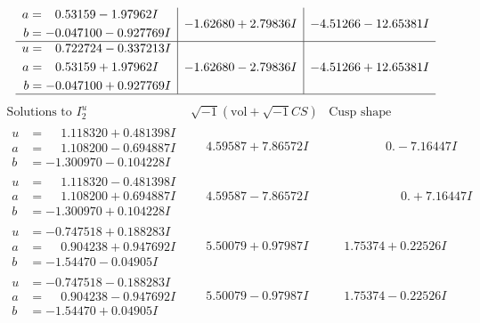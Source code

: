 \documentclass[1p]{elsarticle_modified}
\theoremstyle{definition}
\newcommand{\I}{\sqrt{-1}}
\begin{document}
$$\begin{array}{c|c|c}
\begin{aligned}
a &= \phantom{-}0.53159 - 1.97962 I \\
b &= -0.047100 - 0.927769 I\end{aligned}
 & -1.62680 + 2.79836 I & -4.51266 - 12.65381 I \\ \hline\begin{aligned}
u &= \phantom{-}0.722724 - 0.337213 I \\
a &= \phantom{-}0.53159 + 1.97962 I \\
b &= -0.047100 + 0.927769 I\end{aligned}
 & -1.62680 - 2.79836 I & -4.51266 + 12.65381 I\\
 \hline 
 \end{array}$$\newpage$$\begin{array}{c|c|c}  
\text{Solutions to }I^u_{2}& \I (\text{vol} + \sqrt{-1}CS) & \text{Cusp shape}\\
 \hline 
\begin{aligned}
u &= \phantom{-}1.118320 + 0.481398 I \\
a &= \phantom{-}1.108200 - 0.694887 I \\
b &= -1.300970 - 0.104228 I\end{aligned}
 & \phantom{-}4.59587 + 7.86572 I & \phantom{-0.000000 } 0. - 7.16447 I \\ \hline\begin{aligned}
u &= \phantom{-}1.118320 - 0.481398 I \\
a &= \phantom{-}1.108200 + 0.694887 I \\
b &= -1.300970 + 0.104228 I\end{aligned}
 & \phantom{-}4.59587 - 7.86572 I & \phantom{-0.000000 -}0. + 7.16447 I \\ \hline\begin{aligned}
u &= -0.747518 + 0.188283 I \\
a &= \phantom{-}0.904238 + 0.947692 I \\
b &= -1.54470 - 0.04905 I\end{aligned}
 & \phantom{-}5.50079 + 0.97987 I & \phantom{-}1.75374 + 0.22526 I \\ \hline\begin{aligned}
u &= -0.747518 - 0.188283 I \\
a &= \phantom{-}0.904238 - 0.947692 I \\
b &= -1.54470 + 0.04905 I\end{aligned}
 & \phantom{-}5.50079 - 0.97987 I & \phantom{-}1.75374 - 0.22526 I \\ \hline\begin{aligned}

\end{aligned}
\end{array}$$
\end{document}
